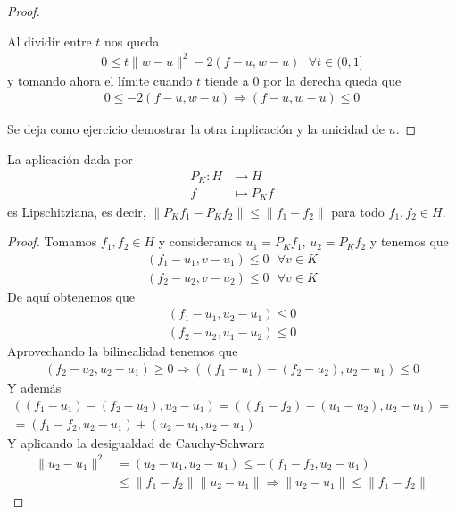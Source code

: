 \begin{teo}
\begin{proof}
\begin{itemize}
            Al dividir entre $t$ nos queda
            \begin{gather*}
                0\leq t\|w-u\|^2-2(f-u,w-u) \ \ \ \forall t \in (0,1]
            \end{gather*}
            y tomando ahora el límite  cuando $t$ tiende a $0$ por la derecha queda que
            \begin{gather*}
                0\leq -2(f-u,w-u) \Rightarrow (f-u,w-u) \leq 0
            \end{gather*}
        \end{itemize}
        Se deja como ejercicio demostrar la otra implicación y la unicidad de $u$.
    \end{proof}
\end{teo}

\begin{prop}
    La aplicación dada por
    \begin{align*}
        P_K: H &\to H\\
        f &\mapsto P_Kf
    \end{align*}
    es Lipschitziana, es decir, $\|P_Kf_1 - P_Kf_2\| \leq \|f_1-f_2\|$ para todo $f_1,f_2\in H$.

    \begin{proof}
        Tomamos $f_1,f_2\in H$ y consideramos $u_1 = P_Kf_1$, $u_2 = P_Kf_2$ y tenemos que 
        \begin{gather*}
            (f_1-u_1, v-u_1) \leq 0 \ \ \ \forall v \in K\\
            (f_2-u_2, v-u_2) \leq 0 \ \ \ \forall v \in K
        \end{gather*}
        De aquí obtenemos que 
        \begin{gather*}
            (f_1-u_1, u_2-u_1) \leq 0\\
            (f_2-u_2, u_1-u_2) \leq 0
        \end{gather*}
        Aprovechando la bilinealidad tenemos que
        \begin{gather*}
            (f_2-u_2, u_2-u_1) \geq 0 \Rightarrow ((f_1-u_1)-(f_2-u_2), u_2-u_1) \leq 0
        \end{gather*}
        Y además
        \begin{gather*}
            ((f_1-u_1)-(f_2-u_2), u_2-u_1) = ((f_1-f_2)-(u_1-u_2), u_2-u_1) =\\= (f_1-f_2, u_2-u_1) + (u_2-u_1, u_2-u_1)
        \end{gather*}
        Y aplicando la desigualdad de Cauchy-Schwarz
        \begin{align*}
            \|u_2-u_1\|^2 &= (u_2-u_1, u_2-u_1) \leq -(f_1-f_2, u_2-u_1)\\
            &\leq \|f_1-f_2\| \|u_2-u_1\| \Rightarrow \|u_2-u_1\| \leq \|f_1-f_2\|
        \end{align*}
    \end{proof}
\end{prop}

